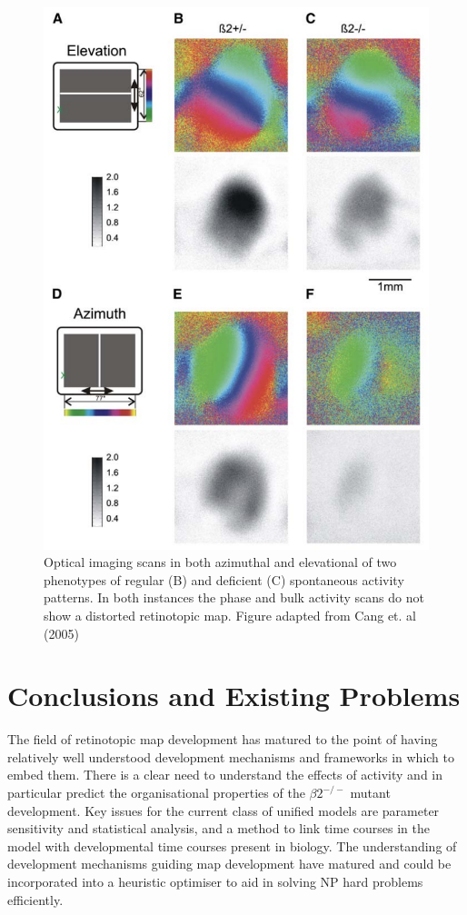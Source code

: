 \begin{figure}
\centering
\includegraphics[width=\textwidth]{images/introduction/V1retinotopy}
\def\c{Observations of the uniformity of topographic maps formed in the retinotopic map in mice. }
\caption[\c]{\label{fig:v1retinotopy} Optical imaging scans in both azimuthal and elevational of two phenotypes of regular (B) and deficient (C) spontaneous activity patterns. In both instances the phase and bulk activity scans do not show a distorted retinotopic map. Figure adapted from Cang et. al (2005) \cite{Cang2005-eg}}
\end{figure}
\newpage
\section{Conclusions and Existing Problems}
The field of retinotopic map development has matured to the point of having relatively well understood development mechanisms and frameworks in which to embed them. There is a clear need to understand the effects of activity and in particular predict the organisational properties of the $\beta2^{-/-}$ mutant development. Key issues for the current class of unified models are parameter sensitivity and statistical analysis, and a method to link time courses in the model with developmental time courses present in biology. The understanding of development mechanisms guiding map development have matured and could be incorporated into a heuristic optimiser to aid in solving NP hard problems efficiently.
